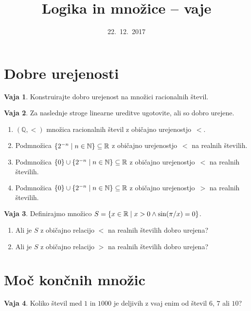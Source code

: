 \documentclass{article}
\newcommand{\NN}{\mathbb{N}}
\newcommand{\QQ}{\mathbb{Q}}
\newcommand{\RR}{\mathbb{R}}
\theoremstyle{definition}
\newtheorem{vaja}{Vaja}
\begin{document}
\title{Logika in množice -- vaje}
\date{22.~12.~2017}
\maketitle


\section{Dobre urejenosti}

\begin{vaja}
  Konstruirajte dobro urejenost na množici racionalnih števil.
\end{vaja}

\begin{vaja}
  Za naslednje stroge linearne ureditve ugotovite, ali so dobro urejene.
  \begin{enumerate}
    \item
      $(\QQ, <)$ množica racionalnih števil z običajno urejenostjo~$<$.
    \item
      Podmnožica $\set{2^{-n}}{n \in \NN} \subseteq \RR$ z običajno urejenostjo~$<$ na realnih številih.
    \item
      Podmnožica $\set{0} \cup \set{2^{-n}}{n \in \NN} \subseteq \RR$ z običajno urejenostjo~$<$ na realnih številih.
    \item
      Podmnožica $\set{0} \cup \set{2^{-n}}{n \in \NN} \subseteq \RR$ z običajno urejenostjo~$>$ na realnih številih.
  \end{enumerate}
\end{vaja}

\begin{vaja}
  Definirajmo množico $S = \set{x \in \RR}{x > 0 \land \sin(\pi/x) = 0}$.
  \begin{enumerate}
    \item Ali je $S$ z običajno relacijo $<$ na realnih številih dobro urejena?
    \item Ali je $S$ z običajno relacijo $>$ na realnih številih dobro urejena?
  \end{enumerate}
\end{vaja}


\section{Moč končnih množic}

\begin{vaja}
  Koliko števil med $1$ in $1000$ je deljivih z vsaj enim od števil $6$, $7$ ali $10$?
\end{vaja}
\end{document}
